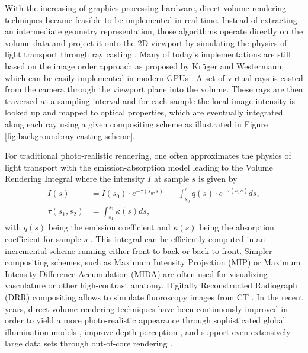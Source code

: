 With the increasing  of graphics processing hardware, direct volume rendering techniques became feasible to be implemented in real-time.
Instead of extracting an intermediate geometry representation, those algorithms operate directly on the volume data and project it onto the 2D viewport by simulating the physics of light transport through ray casting \cite{Engel:2006:VolumeGraphics}.
Many of today's implementations are still based on the image order approach as proposed by Krüger and Westermann, which can be easily implemented in modern GPUs \cite{Kruger:2003:RayCasting}.
A set of virtual rays is casted from the camera through the viewport plane into the volume.
These rays are then traversed at a  sampling interval and for each sample the local image intensity is looked up and mapped to optical properties, which are eventually integrated along each ray using a given compositing scheme as illustrated in Figure \ref{fig:background:ray-casting-scheme}.


For traditional photo-realistic rendering, one often approximates the physics of light transport with the emission-absorption model leading to the Volume Rendering Integral where the intensity $I$ at sample $s$ is given by
\begin{equation}
	\label{eq:VolumeRenderingIntegral}
	\begin{split}
		I(s)			&= 	I(s_0) \cdot e^{-\tau(s_0, s)} \ + \ \int_{s_0}^{s} q(\tilde{s}) \cdot e^{-\tau(\tilde{s}, s)} d\tilde{s}, \\	
		\tau(s_1, s_2) 	&=	\int_{s_1}^{s_2} \kappa(s) ds,
	\end{split}	
\end{equation}
with $q(s)$ being the emission coefficient and $\kappa(s)$ being the absorption coefficient for sample $s$ \cite{Max:1995:VolumeRenderingIntegral}.
This integral can be efficiently computed in an incremental scheme running either front-to-back or back-to-front.
Simpler compositing schemes, such as Maximum Intensity Projection (MIP) or Maximum Intensity Difference Accumulation (MIDA) \cite{Bruckner:2009:MIDA} are often used for visualizing vasculature or other high-contrast anatomy.
Digitally Reconstructed Radiograph (DRR) compositing allows to simulate fluoroscopy images from CT \cite{Metz:2005:DRR, Milickovic:2000:DRR}.
In the recent years, direct volume rendering techniques have been continuously improved in order to yield a more photo-realistic appearance through sophisticated global illumination models \cite{Lindemann:2011:IlluminationSurvey, Joensson:2014:IlluminationSurvey}, improve depth perception \cite{Svakhine:2009:DepthEnhancing, Kersten-Oertel:2014:DepthEnhancing}, and support even extensively large data sets through out-of-core rendering \cite{Crassin:2009:GigaVoxels,Crassin:2011:GigaVoxels}.


